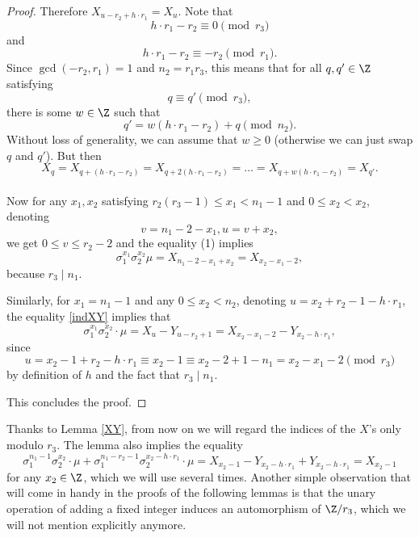 \begin{proof}
Therefore $X_{u -r_2+h\cdot r_1}=X_u$. Note that $$h\cdot r_1-r_2\equiv 0 \pmod{r_3}$$ and $$h\cdot r_1-r_2\equiv -r_2\pmod{r_1}.$$ Since $\gcd(-r_2,r_1)=1$ and $n_2=r_1r_3$, this means that for all $q,q'\in\Z$ satisfying $$q\equiv q'\pmod{r_3},$$ there is some $w\in\Z$ such that $$q'=w(h\cdot r_1-r_2)+q \pmod{n_2}.$$ 
Without loss of generality, we can assume that $w\ge 0$ (otherwise we can just swap $q$ and $q'$). But then $$X_{q}=X_{q+(h\cdot r_1-r_2)}=X_{q+2(h\cdot r_1-r_2)}=\dots=X_{q+w(h\cdot r_1-r_2)}=X_{q'}.$$

\paragraph*{}
Now for any $x_1,x_2$ satisfying $r_2 (r_3-1) \le x_1 < n_1 - 1$ and $0\le x_2 <x_2$, denoting $$v = n_1 - 2 - x_1,  u = v + x_2,$$
we get  $0 \le v \le r_2 - 2$ and the equality (1) implies
$$\sigma_1 ^{x_1} \sigma_2 ^{x_2} \mu = X_{n_1-2-x_1+x_2} 
= X_{x_2-x_1-2},$$
because $r_3 \mid n_1$.

Similarly, for $x_1=n_1-1$ and any $0 \le x_2 <n_2$, denoting $u=x_2+r_2-1-h\cdot r_1$, the equality \eqref{indXY} implies that 
$$\sigma_1^{x_1}\sigma_2^{x_2}\cdot \mu=X_u-Y_{u-r_2+1}=X_{x_2-x_1-2}-Y_{x_2-h\cdot r_1},$$ since 
$$u = x_2-1+r_2-h\cdot r_1 \equiv x_2-1\equiv x_2-2+1-n_1=x_2-x_1-2 \pmod{r_3}$$
by definition of $h$ and the fact that $r_3 \mid n_1$.

This concludes the proof.
\end{proof}

Thanks to Lemma \ref{XY}, from now on we will regard the indices of the $X$'s only modulo $r_3$. %
The lemma also implies the equality
\begin{equation}\label{Ycancel}
\sigma_1^{n_1-1}\sigma_2^{x_2}\cdot \mu+\sigma_1^{n_1-r_2-1}\sigma_2^{x_2-h\cdot r_1}\cdot \mu=X_{x_2-1}-Y_{x_2-h\cdot r_1}+Y_{x_2-h\cdot r_1}= X_{x_2-1}
\end{equation}
for any $x_2\in\Z$, which we will use several times. Another simple observation that will come in handy in the proofs of the following lemmas is that the unary operation of adding a fixed integer induces an automorphism of $\Z/r_3$, which we will not mention explicitly anymore.

